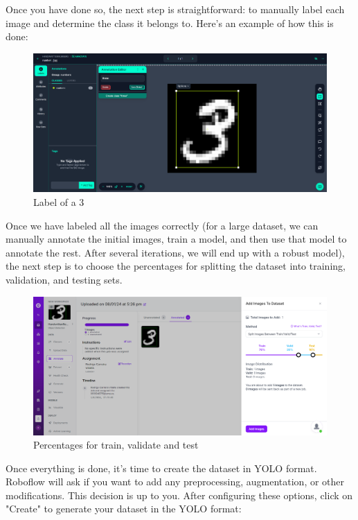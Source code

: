 \documentclass[../main]{subfiles}
\begin{document}
Once you have done so, the next step is straightforward: to manually label each image and determine the class it belongs to. Here’s an example of how this is done: 
\newpage
\begin{figure}[H]
        \centering
        \includegraphics[width=1\textwidth]{./figures/three}
        \caption{Label of a 3}
        \label{fig:red}
\end{figure}
Once we have labeled all the images correctly (for a large dataset, we can manually annotate the initial images, train a model, and then use that model to annotate the rest. After several iterations, we will end up with a robust model), the next step is to choose the percentages for splitting the dataset into training, validation, and testing sets.
\begin{figure}[H]
      \centering
      \includegraphics[width=1\textwidth]{./figures/train}
      \caption{Percentages for train, validate and test}
      \label{fig:red}
\end{figure}
Once everything is done, it's time to create the dataset in YOLO format. Roboflow will ask if you want to add any preprocessing, augmentation, or other modifications. This decision is up to you. After configuring these options, click on "Create" to generate your dataset in the YOLO format:
\newpage
\end{document}
